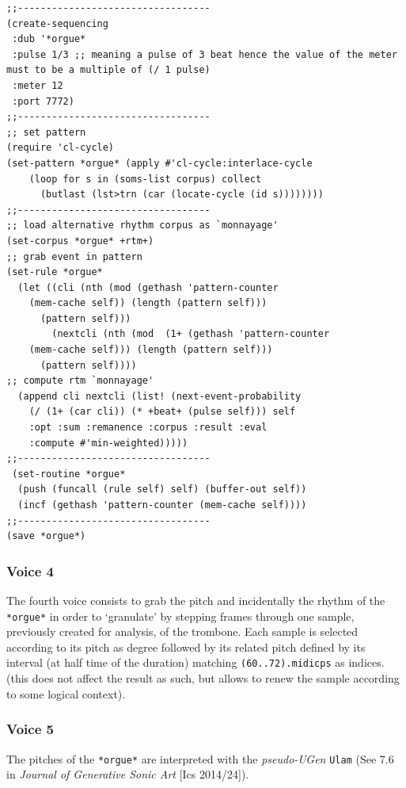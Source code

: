\documentclass{article}
\begin{document}
\begin{lstlisting}[language=N3]
;;----------------------------------
(create-sequencing
 :dub '*orgue*
 :pulse 1/3 ;; meaning a pulse of 3 beat hence the value of the meter must to be a multiple of (/ 1 pulse)
 :meter 12 
 :port 7772)
;;----------------------------------
;; set pattern
(require 'cl-cycle)
(set-pattern *orgue* (apply #'cl-cycle:interlace-cycle
    (loop for s in (soms-list corpus) collect
      (butlast (lst>trn (car (locate-cycle (id s))))))))	
;;----------------------------------		
;; load alternative rhythm corpus as `monnayage'
(set-corpus *orgue* +rtm+)
;; grab event in pattern 
(set-rule *orgue* 
  (let ((cli (nth (mod (gethash 'pattern-counter 
    (mem-cache self)) (length (pattern self))) 
      (pattern self)))
        (nextcli (nth (mod  (1+ (gethash 'pattern-counter 
    (mem-cache self))) (length (pattern self))) 
      (pattern self))))
;; compute rtm `monnayage'
  (append cli nextcli (list! (next-event-probability 
    (/ (1+ (car cli)) (* +beat+ (pulse self))) self 
    :opt :sum :remanence :corpus :result :eval 
    :compute #'min-weighted)))))
;;----------------------------------
 (set-routine *orgue* 
  (push (funcall (rule self) self) (buffer-out self))
  (incf (gethash 'pattern-counter (mem-cache self))))
;;----------------------------------
(save *orgue*)
\end{lstlisting}

\subsubsection{Voice 4}

The fourth voice consists to grab the pitch and incidentally the rhythm of the \texttt{*orgue*} in order to `granulate' by stepping frames through one sample, previously created for analysis, of the trombone. Each sample is selected according to its pitch as degree followed by its related pitch defined by its interval (at half time of the duration) matching \texttt{(60..72).midicps} as indices. (this does not affect the result as such, but allows to renew the sample according to some logical context). 

\subsubsection{Voice 5}

The pitches of the \texttt{*orgue*} are interpreted with the \textit{pseudo-UGen} \texttt{Ulam} 
(See 7.6 in \textsl{Journal of Generative Sonic Art} [Ics 2014/24]).
\end{document}
